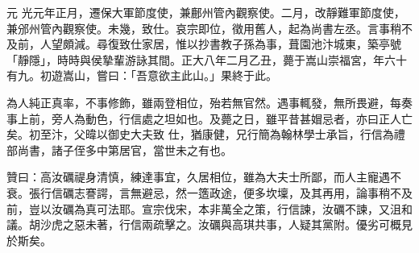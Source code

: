\begin{pinyinscope}
 元
 光元年正月，遷保大軍節度使，兼鄜州管內觀察使。二月，改靜難軍節度使，兼邠州管內觀察使。未幾，致仕。哀宗即位，徵用舊人，起為尚書左丞。言事稍不及前，人望頗減。尋復致仕家居，惟以抄書教子孫為事，葺園池汴城東，築亭號「靜隱」，時時與侯摯輩游詠其間。正大八年二月乙丑，薨于嵩山崇福宮，年六十有九。初遊嵩山，嘗曰：「吾意欲主此山。」果終于此。



 為人純正真率，不事修飾，雖兩登相位，殆若無官然。遇事輒發，無所畏避，每奏事上前，旁人為動色，行信處之坦如也。及薨之日，雖平昔甚媢忌者，亦曰正人亡矣。初至汴，父暐以御史大夫致
 仕，猶康健，兄行簡為翰林學士承旨，行信為禮部尚書，諸子侄多中第居官，當世未之有也。



 贊曰：高汝礪禔身清慎，練達事宜，久居相位，雖為大夫士所鄙，而人主寵遇不衰。張行信礪志謇諤，言無避忌，然一簉政途，便多坎壈，及其再用，論事稍不及前，豈以汝礪為真可法耶。宣宗伐宋，本非萬全之策，行信諫，汝礪不諫，又沮和議。胡沙虎之惡未著，行信兩疏擊之。汝礪與高琪共事，人疑其黨附。優劣可概見於斯矣。



\end{pinyinscope}